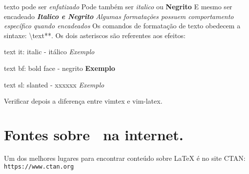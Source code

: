 \documentclass{article}
\begin{document}
texto pode ser \emph{enfatizado}
Pode também ser \textit{italico} ou \textbf{Negrito}
E mesmo ser encadeado \textbf{\textit{Italico e Negrito}}
\emph{Algumas formatações possuem \emph{comportamento específico} quando encadeados}
Os comandos de formatação de texto obedecem a sintaxe: 
\backslash text**. Os dois asteriscos são referentes aos efeitos:
\begin{intemize}
\item{text it: italic - itálico}
    \textit{Exemplo}
\item{text bf: bold face - negrito}
    \textbf{Exemplo}
\item{text sl: slanted - xxxxxx}
    \textsl{Exemplo}
\end{intemize}

Verificar depois a diferença entre vimtex e vim-latex.

\section{\textsf{Fontes sobre \latex\ na internet.}}
Um dos melhores lugares para encontrar conteúdo sobre LaTeX é no site CTAN:
\texttt{https://www.ctan.org}
\end{document}
